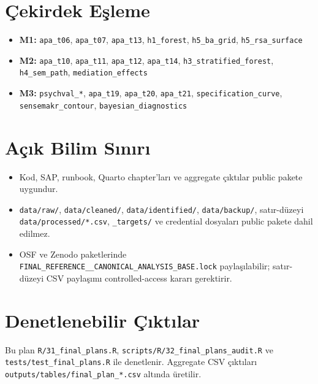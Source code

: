 \documentclass[
  turkish,
  12pt,
  a4paper,
]{report}
\providecommand{\tightlist}{%
  \setlength{\itemsep}{0pt}\setlength{\parskip}{0pt}}
\begin{document}
\section{Çekirdek Eşleme}\label{uxe7ekirdek-eux15fleme}

\begin{itemize}
\tightlist
\item
  \textbf{M1:} \texttt{apa\_t06}, \texttt{apa\_t07}, \texttt{apa\_t13},
  \texttt{h1\_forest}, \texttt{h5\_ba\_grid}, \texttt{h5\_rsa\_surface}
\item
  \textbf{M2:} \texttt{apa\_t10}, \texttt{apa\_t11}, \texttt{apa\_t12},
  \texttt{apa\_t14}, \texttt{h3\_stratified\_forest},
  \texttt{h4\_sem\_path}, \texttt{mediation\_effects}
\item
  \textbf{M3:} \texttt{psychval\_*}, \texttt{apa\_t19},
  \texttt{apa\_t20}, \texttt{apa\_t21}, \texttt{specification\_curve},
  \texttt{sensemakr\_contour}, \texttt{bayesian\_diagnostics}
\end{itemize}

\section{Açık Bilim Sınırı}\label{auxe7ux131k-bilim-sux131nux131rux131}

\begin{itemize}
\tightlist
\item
  Kod, SAP, runbook, Quarto chapter'ları ve aggregate çıktılar public
  pakete uygundur.
\item
  \texttt{data/raw/}, \texttt{data/cleaned/}, \texttt{data/identified/},
  \texttt{data/backup/}, satır-düzeyi \texttt{data/processed/*.csv},
  \texttt{\_targets/} ve credential dosyaları public pakete dahil
  edilmez.
\item
  OSF ve Zenodo paketlerinde
  \texttt{FINAL\_REFERENCE\_\_CANONICAL\_ANALYSIS\_BASE.lock}
  paylaşılabilir; satır-düzeyi CSV paylaşımı controlled-access kararı
  gerektirir.
\end{itemize}

\section{Denetlenebilir
Çıktılar}\label{denetlenebilir-uxe7ux131ktux131lar}

Bu plan \texttt{R/31\_final\_plans.R},
\texttt{scripts/R/32\_final\_plans\_audit.R} ve
\texttt{tests/test\_final\_plans.R} ile denetlenir. Aggregate CSV
çıktıları \texttt{outputs/tables/final\_plan\_*.csv} altında üretilir.
\end{document}
